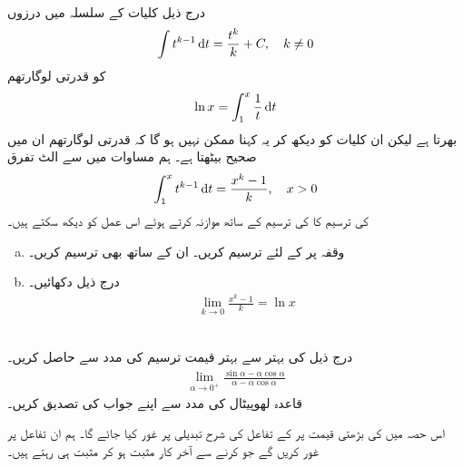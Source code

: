 \\
درج ذیل کلیات کے  سلسلہ میں  درزوں  
\begin{align}\label{مساوات_سوال_ماورائی_لوگارتھم}
\int t^{k-1}\dif t=\frac{t^k}{k}+C,\quad k\ne 0
\end{align}
کو قدرتی لوگارتھم
\begin{align*}
\ln x=\int_1^x\frac{1}{t}\dif t
\end{align*}
بھرتا ہے لیکن ان کلیات  کو دیکھ کر یہ کہنا ممکن نہیں ہو گا کہ قدرتی لوگارتھم ان میں صحیح بیٹھتا ہے۔ ہم مساوات  میں سے الٹ تفرق 
\begin{align*}
\int_1^xt^{k-1}\dif t=\frac{x^k-1}{k},\quad x>0
\end{align*}
کی ترسیم کا  کی ترسیم کے ساتھ موازنہ کرتے ہوئے اس عمل کو دیکھ سکتے ہیں۔
\begin{enumerate}[a.]
\item
وقفہ  پر  کے لئے   ترسیم کریں۔ ان کے ساتھ  بھی ترسیم کریں۔
\item
درج ذیل دکھائیں۔
\begin{align*}
\lim_{k\to 0}\frac{x^k-1}{k}=\ln x
\end{align*}
\end{enumerate}
\\
درج ذیل کی بہتر سے بہتر قیمت ترسیم کی مدد سے حاصل کریں۔
\begin{align*}
\lim_{\alpha\to 0^+}\frac{\sin\alpha-\alpha\cos\alpha}{\alpha-\alpha\cos\alpha}
\end{align*} 
قاعدہ لھوپیٹال کی مدد سے اپنے جواب کی تصدیق کریں۔

اس حصہ میں  کی بڑھتی قیمت پر  کے تفاعل کی شرح تبدیلی پر غور کیا جائے گا۔ ہم ان تفاعل پر غور کریں گے جو  کرنے سے آخر کار مثبت ہو کر مثبت ہی رہتے ہیں۔ 

